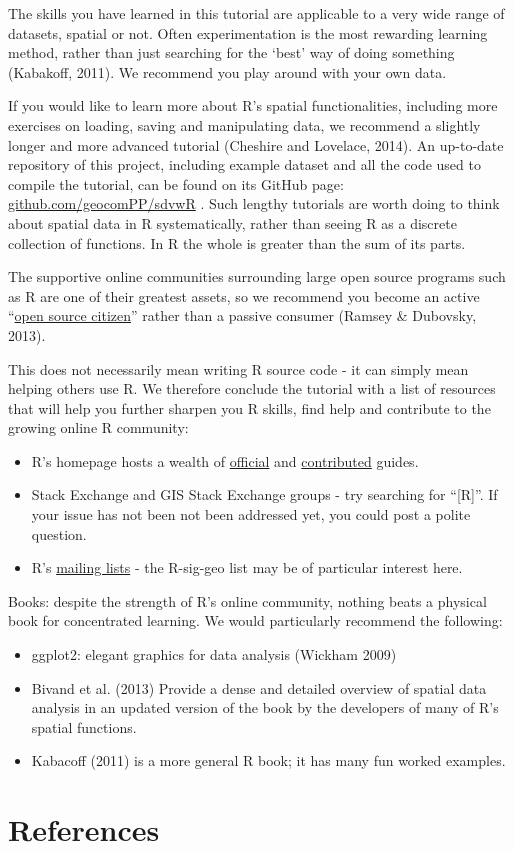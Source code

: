 \documentclass[]{article}
\begin{document}
The skills you have learned in this tutorial are applicable to a very
wide range of datasets, spatial or not. Often experimentation is the
most rewarding learning method, rather than just searching for the
`best' way of doing something (Kabakoff, 2011). We recommend you play
around with your own data.

If you would like to learn more about R's spatial functionalities,
including more exercises on loading, saving and manipulating data, we
recommend a slightly longer and more advanced tutorial (Cheshire and
Lovelace, 2014). An up-to-date repository of this project, including
example dataset and all the code used to compile the tutorial, can be
found on its GitHub page:
\href{https://github.com/geocomPP/sdvwR}{github.com/geocomPP/sdvwR} .
Such lengthy tutorials are worth doing to think about spatial data in R
systematically, rather than seeing R as a discrete collection of
functions. In R the whole is greater than the sum of its parts.

The supportive online communities surrounding large open source programs
such as R are one of their greatest assets, so we recommend you become
an active
``\href{http://blog.cleverelephant.ca/2013/10/being-open-source-citizen.html}{open
source citizen}'' rather than a passive consumer (Ramsey \& Dubovsky,
2013).

This does not necessarily mean writing R source code - it can simply
mean helping others use R. We therefore conclude the tutorial with a
list of resources that will help you further sharpen you R skills, find
help and contribute to the growing online R community:

\begin{itemize}
\item
  R's homepage hosts a wealth of
  \href{http://cran.r-project.org/manuals.html}{official} and
  \href{http://cran.r-project.org/other-docs.html}{contributed} guides.
\item
  Stack Exchange and GIS Stack Exchange groups - try searching for
  ``{[}R{]}''. If your issue has not been not been addressed yet, you
  could post a polite question.
\item
  R's \href{http://www.r-project.org/mail.html}{mailing lists} - the
  R-sig-geo list may be of particular interest here.
\end{itemize}
Books: despite the strength of R's online community, nothing beats a
physical book for concentrated learning. We would particularly recommend
the following:

\begin{itemize}
\item
  ggplot2: elegant graphics for data analysis (Wickham 2009)
\item
  Bivand et al. (2013) Provide a dense and detailed overview of spatial
  data analysis in an updated version of the book by the developers of
  many of R's spatial functions.
\item
  Kabacoff (2011) is a more general R book; it has many fun worked
  examples.
\end{itemize}
\newpage \section{References}
\end{document}
